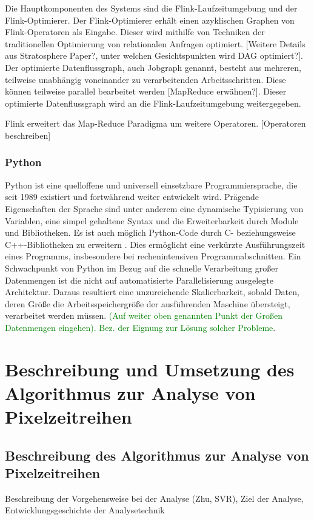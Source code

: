 Die Hauptkomponenten des Systems sind die Flink-Laufzeitumgebung und der Flink-Optimierer. Der Flink-Optimierer erhält einen azyklischen Graphen von Flink-Operatoren als Eingabe. Dieser wird mithilfe von Techniken der traditionellen Optimierung von relationalen Anfragen optimiert. [Weitere Details aus Stratosphere Paper?, unter welchen Gesichtspunkten wird DAG optimiert?]. Der optimierte Datenflussgraph, auch Jobgraph genannt, besteht aus mehreren, teilweise unabhängig voneinander zu verarbeitenden Arbeitsschritten. Diese können teilweise parallel bearbeitet werden [MapReduce erwähnen?]. Dieser optimierte Datenflussgraph wird an die Flink-Laufzeitumgebung weitergegeben. 

Flink erweitert das Map-Reduce Paradigma um weitere Operatoren. [Operatoren beschreiben]
\subsection{Python}
Python ist eine quelloffene und universell einsetzbare Programmiersprache, die seit 1989 existiert und fortwährend weiter entwickelt wird. Prägende Eigenschaften der Sprache sind unter anderem eine dynamische Typisierung von Variablen, eine simpel gehaltene Syntax und die Erweiterbarkeit durch Module und Bibliotheken. Es ist auch möglich Python-Code durch C- beziehungsweise C++-Bibliotheken zu erweitern \cite{Martelli2006}. Dies ermöglicht eine verkürzte Ausführungszeit eines Programms, insbesondere bei rechenintensiven Programmabschnitten. Ein Schwachpunkt von Python im Bezug auf die schnelle Verarbeitung großer Datenmengen ist die nicht auf automatisierte Parallelisierung ausgelegte Architektur. Daraus resultiert eine unzureichende Skalierbarkeit, sobald Daten, deren Größe die Arbeitsspeichergröße der ausführenden Maschine übersteigt, verarbeitet werden müssen. \textcolor{green}{(Auf weiter oben genannten Punkt der Großen Datenmengen eingehen). Bez. der Eignung zur Lösung solcher Probleme}. 


\chapter[Algorithmus zur Analyse von Pixelzeitreihen]{Beschreibung und Umsetzung des Algorithmus zur Analyse von Pixelzeitreihen}
\section[Beschreibung des Algorithmus]{Beschreibung des Algorithmus zur Analyse von Pixelzeitreihen}
Beschreibung der Vorgehensweise bei der Analyse (Zhu, SVR), Ziel der Analyse, Entwicklungsgeschichte der Analysetechnik
